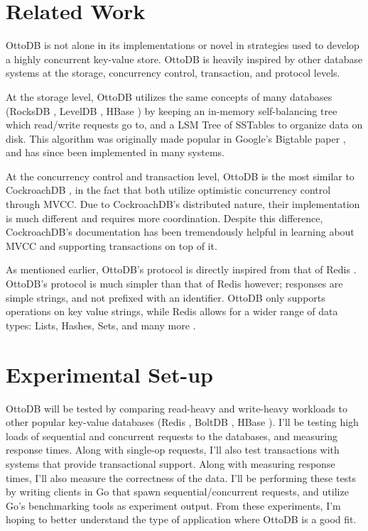 \documentclass[conference]{IEEEtran}
\begin{document}
    \section{Related Work}
    OttoDB is not alone in its implementations or novel in strategies used to develop a highly concurrent key-value store. OttoDB is heavily inspired by other database systems at the storage, concurrency control, transaction, and protocol levels. 

    At the storage level, OttoDB utilizes the same concepts of many databases (RocksDB \cite{b6}, LevelDB \cite{b7}, HBase \cite{b4}) by keeping an in-memory self-balancing tree which read/write requests go to, and a LSM Tree of SSTables to organize data on disk. This algorithm was originally made popular in Google’s Bigtable paper \cite[p. 78]{b18}, and has since been implemented in many systems. 

    At the concurrency control and transaction level, OttoDB is the most similar to CockroachDB \cite{b8}, in the fact that both utilize optimistic concurrency control through MVCC. Due to CockroachDB’s distributed nature, their implementation is much different and requires more coordination. Despite this difference, CockroachDB’s documentation has been tremendously helpful in learning about MVCC and supporting transactions on top of it. 

	As mentioned earlier, OttoDB's protocol is directly inspired from that of Redis \cite{b1}. OttoDB’s protocol is much simpler than that of Redis however; responses are simple strings, and not prefixed with an identifier. OttoDB only supports operations on key value strings, while Redis allows for a wider range of data types: Lists, Hashes, Sets, and many more \cite{b11}.


    \section{Experimental Set-up}
    OttoDB will be tested by comparing read-heavy and write-heavy workloads to other popular key-value databases (Redis \cite{b1}, BoltDB \cite{b5}, HBase \cite{b4}). I’ll be testing high loads of sequential and concurrent requests to the databases, and measuring response times. Along with single-op requests, I’ll also test transactions with systems that provide transactional support. Along with measuring response times, I’ll also measure the correctness of the data. I’ll be performing these tests by writing clients in Go that spawn sequential/concurrent requests, and utilize Go’s benchmarking tools as experiment output. From these experiments, I’m hoping to better understand the type of application where OttoDB is a good fit. 
\end{document}
